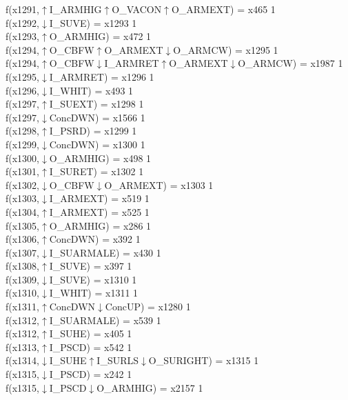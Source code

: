 f(x1291,$\uparrow$I\_ARMHIG$\uparrow$O\_VACON$\uparrow$O\_ARMEXT) = x465 {1} \\
f(x1292,$\downarrow$I\_SUVE) = x1293 {1} \\
f(x1293,$\uparrow$O\_ARMHIG) = x472 {1} \\
f(x1294,$\uparrow$O\_CBFW$\uparrow$O\_ARMEXT$\downarrow$O\_ARMCW) = x1295 {1} \\
f(x1294,$\uparrow$O\_CBFW$\downarrow$I\_ARMRET$\uparrow$O\_ARMEXT$\downarrow$O\_ARMCW) = x1987 {1} \\
f(x1295,$\downarrow$I\_ARMRET) = x1296 {1} \\
f(x1296,$\downarrow$I\_WHIT) = x493 {1} \\
f(x1297,$\uparrow$I\_SUEXT) = x1298 {1} \\
f(x1297,$\downarrow$ConcDWN) = x1566 {1} \\
f(x1298,$\uparrow$I\_PSRD) = x1299 {1} \\
f(x1299,$\downarrow$ConcDWN) = x1300 {1} \\
f(x1300,$\downarrow$O\_ARMHIG) = x498 {1} \\
f(x1301,$\uparrow$I\_SURET) = x1302 {1} \\
f(x1302,$\downarrow$O\_CBFW$\downarrow$O\_ARMEXT) = x1303 {1} \\
f(x1303,$\downarrow$I\_ARMEXT) = x519 {1} \\
f(x1304,$\uparrow$I\_ARMEXT) = x525 {1} \\
f(x1305,$\uparrow$O\_ARMHIG) = x286 {1} \\
f(x1306,$\uparrow$ConcDWN) = x392 {1} \\
f(x1307,$\downarrow$I\_SUARMALE) = x430 {1} \\
f(x1308,$\uparrow$I\_SUVE) = x397 {1} \\
f(x1309,$\downarrow$I\_SUVE) = x1310 {1} \\
f(x1310,$\downarrow$I\_WHIT) = x1311 {1} \\
f(x1311,$\uparrow$ConcDWN$\downarrow$ConcUP) = x1280 {1} \\
f(x1312,$\uparrow$I\_SUARMALE) = x539 {1} \\
f(x1312,$\uparrow$I\_SUHE) = x405 {1} \\
f(x1313,$\uparrow$I\_PSCD) = x542 {1} \\
f(x1314,$\downarrow$I\_SUHE$\uparrow$I\_SURLS$\downarrow$O\_SURIGHT) = x1315 {1} \\
f(x1315,$\downarrow$I\_PSCD) = x242 {1} \\
f(x1315,$\downarrow$I\_PSCD$\downarrow$O\_ARMHIG) = x2157 {1} \\
